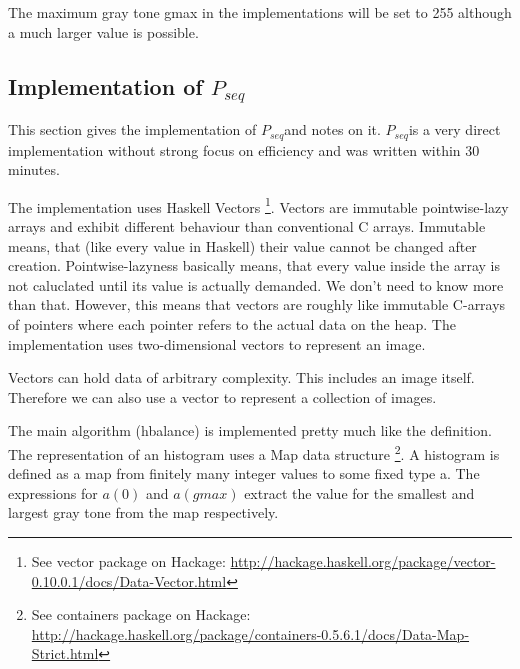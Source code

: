 \documentclass{article}
\newcommand{\seq}[0]{$P_{seq}$}
\begin{document}
      The maximum gray tone gmax in the implementations will be set to 255 although
      a much larger value is possible.
    
    \newpage
    
    \subsection{Implementation of \seq}
      This section gives the implementation of \seq and notes on it.
      \seq is a very direct implementation without strong focus on efficiency and
      was written within 30 minutes.
      
      
      
      The implementation uses Haskell Vectors \footnote[1]{See vector package on Hackage: \url{http://hackage.haskell.org/package/vector-0.10.0.1/docs/Data-Vector.html}}.
      Vectors are immutable pointwise-lazy arrays and
      exhibit different behaviour than conventional C arrays.
      Immutable means, that (like every value in Haskell) their value cannot be changed after creation.
      Pointwise-lazyness basically means, that every value inside the array is not caluclated
      until its value is actually demanded. We don't need to know more than that.
      However, this means that vectors are roughly like immutable C-arrays of pointers
      where each pointer refers to the actual data on the heap.
      The implementation uses two-dimensional vectors to represent an image.
      
      Vectors can hold data of arbitrary complexity. This includes an image itself.
      Therefore we can also use a vector to represent a collection of images.
      
      The main algorithm (hbalance) is implemented pretty much like the definition.
      The representation of an histogram uses a Map data structure \footnote[2]{See containers package on Hackage: \url{http://hackage.haskell.org/package/containers-0.5.6.1/docs/Data-Map-Strict.html}}.
      A histogram is defined as a map from finitely many integer values to some fixed type a.
      The expressions for $a(0)$ and $a(gmax)$ extract the value for the smallest
      and largest gray tone from the map respectively.
      
\end{document}
